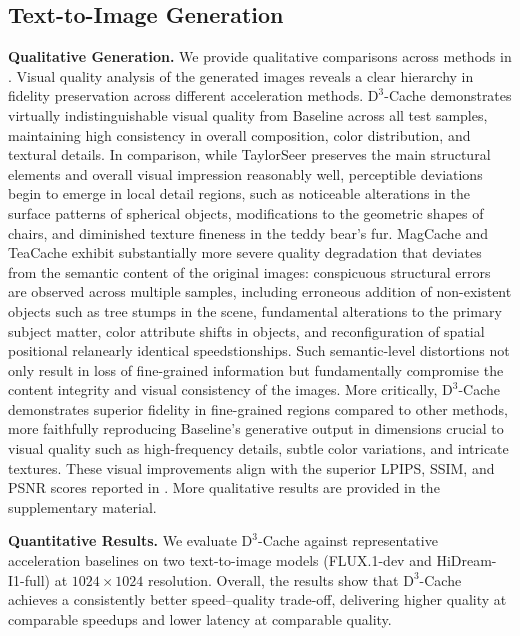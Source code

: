 
\subsection{Text-to-Image Generation}\label{sec:results:text_to_image_generation}


\textbf{Qualitative Generation.}
We provide qualitative comparisons across methods
in .
Visual quality analysis
of the generated images
reveals a clear hierarchy
in fidelity preservation
across different acceleration methods.
$\mathrm{D}^3$-Cache
demonstrates virtually indistinguishable
visual quality from Baseline
across all test samples,
maintaining high consistency
in overall composition,
color distribution,
and textural details.
In comparison,
while TaylorSeer preserves the main structural elements
and overall visual impression
reasonably well,
perceptible deviations
begin to emerge
in local detail regions,
such as noticeable alterations in the surface patterns of spherical objects,
modifications to the geometric shapes of chairs,
and diminished texture fineness in the teddy bear's fur.
MagCache and TeaCache
exhibit substantially more severe quality degradation
that deviates from the semantic content of the original images:
conspicuous structural errors
are observed across multiple samples,
including erroneous addition of non-existent objects
such as tree stumps in the scene,
fundamental alterations to the primary subject matter,
color attribute shifts in objects,
and reconfiguration of spatial positional relanearly identical speedstionships.
Such semantic-level distortions
not only result in loss of fine-grained information
but fundamentally compromise the content integrity
and visual consistency of the images.
More critically,
$\mathrm{D}^3$-Cache
demonstrates superior fidelity
in fine-grained regions
compared to other methods,
more faithfully reproducing Baseline's generative output
in dimensions
crucial to visual quality
such as high-frequency details,
subtle color variations,
and intricate textures.
These visual improvements
align with the superior LPIPS, SSIM, and PSNR scores
reported in .
More qualitative results are provided in the supplementary material.

\textbf{Quantitative Results.}
We evaluate $\mathrm{D}^3$-Cache
against representative acceleration baselines
on two text-to-image models
(FLUX.1-dev and HiDream-I1-full)
at \(1024\times1024\)   resolution.
Overall,
the results show that $\mathrm{D}^3$-Cache
achieves a consistently better speed--quality trade-off,
delivering higher quality
at comparable   speedups
and lower latency
at comparable quality.

